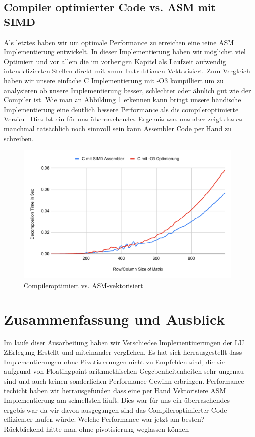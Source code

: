 \documentclass[course=erap]{aspdoc}
\begin{document}
 \subsection{Compiler optimierter Code vs. ASM mit SIMD}
Als letztes haben wir um optimale Performance zu erreichen eine reine ASM Implementierung entwickelt. In dieser Implementierung haben wir möglichst viel Optimiert und vor allem die im vorherigen Kapitel als Laufzeit aufwendig
 intendefizierten Stellen direkt mit xmm Instruktionen Vektorisiert. Zum Vergleich haben wir unsere einfache C Implementierung mit -O3 kompilliert um zu analysieren ob unsere Implementierung besser, schlechter oder ähnlich gut wie der Compiler ist.
 Wie man an Abbildung \ref{CvsASM} erkennen kann bringt unsere händische Implementierung eine deutlich bessere Performance als die compileroptimierte Version. Dies Ist ein für uns überraschendes Ergebnis was uns aber zeigt das 
 es manchmal tatsächlich noch sinnvoll sein kann Assembler Code per Hand zu schreiben.

 \begin{figure}[H]
 \begin{center}
 \caption{Compileroptimiert vs. ASM-vektorisiert} 
  \label{CvsASM}
 \includegraphics[width = 0.8\linewidth]{CvsASM.pdf}

 
 \end{center}
\end{figure}



\section{Zusammenfassung und Ausblick}
Im laufe diser Ausarbeitung haben wir Verschiedee Implementiuerungen der LU ZErlegung Erstellt und miteinander verglichen. Es hat sich herrausgestellt dass Implementierungen ohne Pivotisierungen nicht zu Empfehlen sind,
die sie aufgrund von Floatingpoint arithmethischen Gegebenheitenheiten sehr ungenau sind und auch keinen sonderlichen Performance Gewinn erbringen. Performance techicht haben wir herrausgefunden dass eine per Hand Vektorisiere ASM Implementierung am 
schnellsten läuft. Dies war für uns ein überraschendes ergebis war da wir davon ausgegangen sind das Compileroptimierter Code effizienter laufen würde.   
Welche Performance war jetzt am besten?\\
Rückblickend hätte man ohne pivotisierung weglassen können\\

{}
\end{document}

